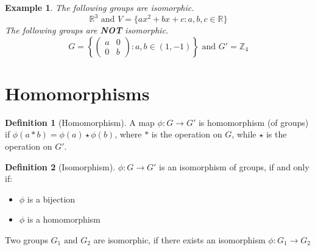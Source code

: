 \documentclass{article}
\theoremstyle{MyNonumberplain}
\theoremstyle{break}
\newcommand{\infixand}{\text{ and }}
\theoremstyle{break}
\newtheorem{example}{Example}[section]
\theoremstyle{break}
\theoremstyle{definition}
\theoremstyle{break}
\newtheorem{definition}{Definition}[section]
\begin{document}
\begin{expbox}
    \begin{example}
        The following groups are isomorphic. 
        \[ \mathbb{R}^3 \infixand V = \{ a x^2 + b x + c : a, b, c \in \mathbb{R} \}
        \]
        The following groups are \textbf{NOT} isomorphic.
        \[ G = \left\{ \left(\begin{array}{cc}
            a & 0\\
            0 & b
        \end{array}\right) : a, b \in (1, - 1) \right\} \infixand G' =\mathbb{Z}_4
        \]
    \end{example}
\end{expbox}

\newpage

\setcounter{section}{12}

\section{Homomorphisms}

\begin{defbox}
    \begin{definition}[Homomorphism]
        A map $\phi : G \rightarrow G'$ is homomorphism (of groups) if $\phi (a \ast
        b) = \phi (a) \star \phi (b)$, where $\ast$ is the operation on $G$, while $\star$ is the operation on $G'$. 
    \end{definition}
\end{defbox}

\begin{defbox}
    \begin{definition}[Isomorphism]
        $\phi : G \rightarrow G'$ is an isomorphism of groups, if and only if:\\
        \begin{itemize}
        \item $\phi$ is a bijection\\
        
        \item $\phi$ is a homomorphism\\
        \end{itemize}
        Two groups $G_1 \infixand G_2$ are isomorphic, if there exists an isomorphism
        $\phi : G_1 \rightarrow G_2$
    \end{definition}
\end{defbox}
\end{document}
